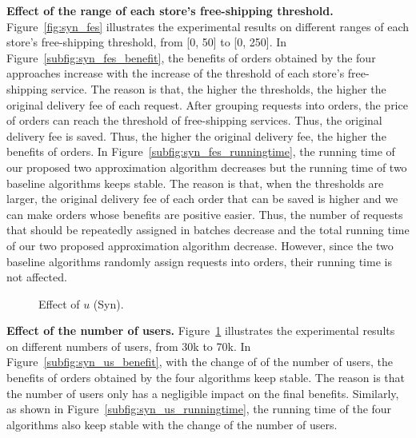 \textbf{Effect of the range of each store's free-shipping threshold.} Figure~\ref{fig:syn_fes} illustrates the experimental results on different ranges of each store's free-shipping threshold, from [0, 50] to [0, 250]. In Figure~\ref{subfig:syn_fes_benefit}, the benefits of orders obtained by the four approaches increase with the increase of the threshold of each store's free-shipping service. The reason is that, the higher the thresholds, the higher the original delivery fee of each request. After grouping requests into orders, the price of orders can reach the threshold of free-shipping services. Thus, the original delivery fee is saved. Thus, the higher the original delivery fee, the higher the benefits of orders. In Figure~\ref{subfig:syn_fes_runningtime}, the running time of our proposed two approximation algorithm decreases but the running time of two baseline algorithms keeps stable. The reason is that, when the thresholds are larger, the original delivery fee of each order that can be saved is higher and we can make orders whose benefits are positive easier. Thus, the number of requests that should be repeatedly assigned in batches decrease and the total running time of our two proposed approximation algorithm decrease. However, since the two baseline algorithms randomly assign requests into orders, their running time is not affected. 

\begin{figure}[t!]\centering 
	\subfigcapskip=-5pt
	\vspace{1ex}
	\vspace{-2ex}
	\addtocounter{subfigure}{-1}
	\figureCaptionMargin
	\vspace{1ex}
	\caption{\small Effect of $u$ (Syn).}\figureBelowMargin
	\label{fig:syn_us}
\end{figure}

\textbf{Effect of the number of users.} Figure~\ref{fig:syn_us} illustrates the experimental results on different numbers of users, from 30k to 70k. In Figure~\ref{subfig:syn_us_benefit}, with the change of of the number of users, the benefits of orders obtained by the four algorithms keep stable. The reason is that the number of users only has a negligible impact on the final benefits. Similarly, as shown in Figure~\ref{subfig:syn_us_runningtime}, the running time of the four algorithms also keep stable with the change of the number of users.

